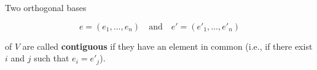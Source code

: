 Two orthogonal bases

$$e = (e_1, \dots, e_n) \quad\text{and}\quad e' = (e'_1, \dots, e'_n)$$

of $V$ are called \textbf{contiguous} if they have an element in common (i.e., if there exist $i$ and $j$ such that $e_i = e'_j$).
